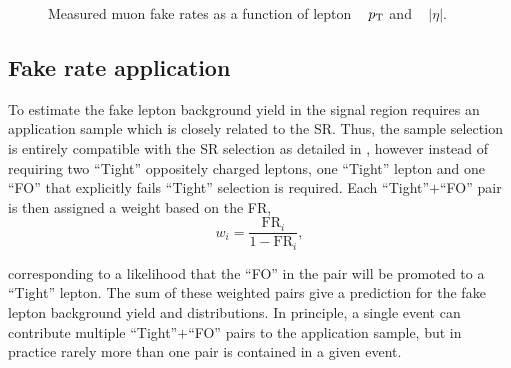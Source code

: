 \begin{figure}[htbp!]
\begin{center}
  \caption{Measured muon fake rates as a function of lepton ~\protect{} $p_{\mathrm{T}}$ and ~\protect{} $|\eta|$.}
  \label{fig:muon_fr_plots}
\end{center}
\end{figure}

\subsection{Fake rate application}
\label{subsec:fr_app}
 To estimate the fake lepton background yield in the signal region requires an application sample which is closely related to the SR. Thus, the sample selection is entirely compatible with the SR selection as detailed in , however instead of requiring two ``Tight'' oppositely charged leptons, one ``Tight'' lepton and one ``FO'' that explicitly fails ``Tight'' selection is required. Each ``Tight''$+$``FO'' pair is then assigned a weight based on the FR, 
\begin{equation}
  w_i = \frac{\text{FR}_i}{1-\text{FR}_i},
\end{equation}

corresponding to a likelihood that the ``FO'' in the pair will be promoted to a ``Tight'' lepton. The sum of these weighted pairs give a prediction for the fake lepton background yield and distributions. In principle, a single event can contribute multiple ``Tight''$+$``FO'' pairs to the application sample, but in practice rarely more than one pair is contained in a given event.

